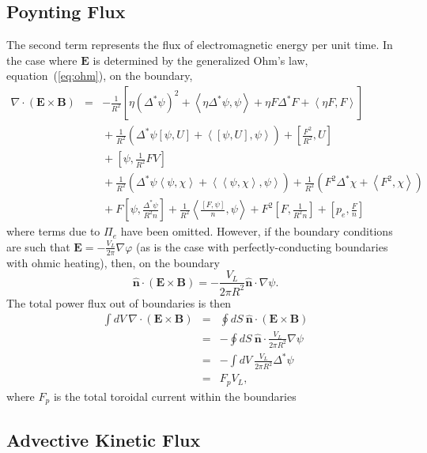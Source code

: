 \documentclass[letterpaper]{book}
\renewcommand{\vec}[1]{\ensuremath{\mathbf{#1}}}
\newcommand{\tensor}[1]{\mathsf{#1}}
\newcommand{\tor}{\varphi}              %
\newcommand{\B}{\vec{B}}
\newcommand{\E}{\vec{E}}
\renewcommand{\P}{\tensor{\Pi}}
\newcommand{\grad}[1]{\nabla #1}
\renewcommand{\div}[1]{\nabla \cdot #1}
\newcommand{\gs}[1]{\Delta^* #1}
\newcommand{\pb}[2]{\left[#1,#2\right]}
\newcommand{\ip}[2]{\left\langle  #1,#2\right\rangle}
\newcommand{\uvec}[1]{\ensuremath{\vec{\hat{#1}}}}
\begin{document}
\subsection{Poynting Flux}

The second term represents the flux of electromagnetic energy per unit
time.  In the case where $\E$ is determined by the generalized Ohm's
law, equation~(\ref{eq:ohm}), on the boundary,
\begin{eqnarray}
  \div (\E\times\B) & = & -\frac{1}{R^2} 
  \left[\eta (\gs{\psi})^2 + \ip{\eta \gs\psi}{\psi}
    + \eta F \gs{F} + \ip{\eta F}{F} \right]
  \\ && \mbox{}
  + \frac{1}{R^2}\left(\gs\psi\pb{\psi}{U} 
  + \ip{\pb{\psi}{U}}{\psi} \right)
  + \pb{\frac{F^2}{R^2}}{U}
  \nonumber \\ && \mbox{}
  + \pb{\psi}{\frac{1}{R^2} F V}
  \nonumber \\ && \mbox{}
  + \frac{1}{R^2}\left(\gs\psi\ip{\psi}{\chi}
  + \ip{\ip{\psi}{\chi}}{\psi} \right)
  + \frac{1}{R^2}\left(F^2\gs\chi + \ip{F^2}{\chi}\right)
  \nonumber \\ && \mbox{}
  + F \pb{\psi}{\frac{\gs{\psi}}{R^2 n}}
  + \frac{1}{R^2} \ip{\frac{\pb{F}{\psi}}{n}}{\psi}
  + F^2 \pb{F}{\frac{1}{R^2 n}} 
  + \pb{p_e}{\frac{F}{n}} \nonumber
\end{eqnarray}
where terms due to $\P_e$ have been omitted.  However, if the
boundary conditions are such that $\E = -\frac{V_L}{2 \pi} \grad\tor$
(as is the case with perfectly-conducting boundaries with ohmic
heating), then, on the boundary
\begin{equation}
  \uvec{n} \cdot (\E\times\B) = 
  -\frac{V_L}{2 \pi R^2} \uvec{n} \cdot \grad\psi.
\end{equation}
The total power flux out of boundaries is then
\begin{eqnarray*}
  \int dV\ \div (\E\times\B) 
  & = & \oint dS\ \uvec{n} \cdot (\E\times\B) \\
  & = & -\oint dS\ \uvec{n} \cdot \frac{V_L}{2 \pi R^2} \grad\psi \\
  & = & -\int dV\ \frac{V_L}{2 \pi R^2} \gs\psi\\
  & = & F_p V_L,
\end{eqnarray*}
where $F_p$ is the total toroidal current within the boundaries


\subsection{Advective Kinetic Flux}
\end{document}
